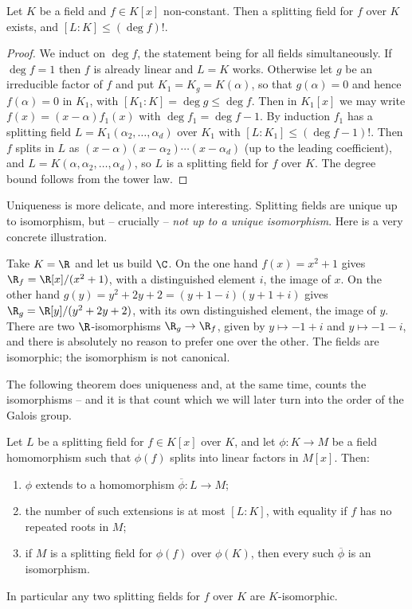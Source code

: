 \begin{theorem}\label{thm:splitexist}
	Let $K$ be a field and $f \in K[x]$ non-constant. Then a splitting field for $f$ over $K$ exists, and $[L:K] \leq (\deg f)!$.
\end{theorem}

\begin{proof}
	We induct on $\deg f$, the statement being for all fields simultaneously. If $\deg f = 1$ then $f$ is already linear and $L = K$ works. Otherwise let $g$ be an irreducible factor of $f$ and put $K_1 = K_g = K(\alpha)$, so that $g(\alpha) = 0$ and hence $f(\alpha) = 0$ in $K_1$, with $[K_1 : K] = \deg g \leq \deg f$. Then in $K_1[x]$ we may write $f(x) = (x-\alpha)f_1(x)$ with $\deg f_1 = \deg f - 1$. By induction $f_1$ has a splitting field $L = K_1(\alpha_2, \dots, \alpha_d)$ over $K_1$ with $[L:K_1] \leq (\deg f - 1)!$. Then $f$ splits in $L$ as $(x-\alpha)(x-\alpha_2)\cdots(x-\alpha_d)$ (up to the leading coefficient), and $L = K(\alpha, \alpha_2, \dots, \alpha_d)$, so $L$ is a splitting field for $f$ over $K$. The degree bound follows from the tower law.
\end{proof}

Uniqueness is more delicate, and more interesting. Splitting fields are unique up to isomorphism, but -- crucially -- \emph{not up to a unique isomorphism}. Here is a very concrete illustration.

\begin{example}
	Take $K = \R$ and let us build $\C$. On the one hand $f(x) = x^2+1$ gives $\R_f = \R[x]/(x^2+1)$, with a distinguished element $i$, the image of $x$. On the other hand $g(y) = y^2 + 2y + 2 = (y+1-i)(y+1+i)$ gives $\R_g = \R[y]/(y^2+2y+2)$, with its own distinguished element, the image of $y$. There are two $\R$-isomorphisms $\R_g \to \R_f$, given by $y \mapsto -1 + i$ and $y \mapsto -1 - i$, and there is absolutely no reason to prefer one over the other. The fields are isomorphic; the isomorphism is not canonical.
\end{example}

The following theorem does uniqueness and, at the same time, counts the isomorphisms -- and it is that count which we will later turn into the order of the Galois group.

\begin{theorem}\label{thm:splituniq}
	Let $L$ be a splitting field for $f \in K[x]$ over $K$, and let $\phi : K \to M$ be a field homomorphism such that $\phi(f)$ splits into linear factors in $M[x]$. Then:
	\begin{enumerate}[label=(\roman*)]
		\item $\phi$ extends to a homomorphism $\overline\phi : L \to M$;
		\item the number of such extensions is at most $[L:K]$, with equality if $f$ has no repeated roots in $M$;
		\item if $M$ is a splitting field for $\phi(f)$ over $\phi(K)$, then every such $\overline\phi$ is an isomorphism.
	\end{enumerate}
	In particular any two splitting fields for $f$ over $K$ are $K$-isomorphic.
\end{theorem}

